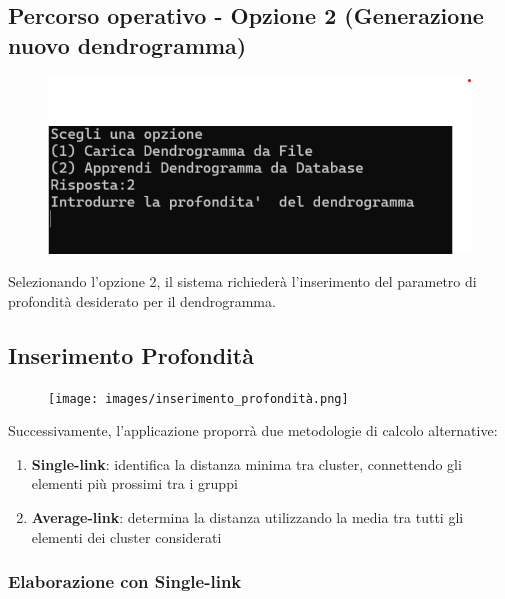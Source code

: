 \subsection{Percorso operativo - Opzione 2 (Generazione nuovo dendrogramma)}

\begin{figure}[h!]
    \centering
    \includegraphics[width=\textwidth]{images/apprendi_datagramma.png}
\end{figure}

Selezionando l'opzione 2, il sistema richiederà l'inserimento del parametro di profondità desiderato per il dendrogramma.

\subsection{Inserimento Profondità}

\begin{figure}[h!]
    \centering
    \texttt{[image: images/inserimento\_profondità.png]}
\end{figure}

Successivamente, l'applicazione proporrà due metodologie di calcolo alternative:
\begin{enumerate}
    \item \textbf{Single-link}: identifica la distanza minima tra cluster, connettendo gli elementi più prossimi tra i gruppi
    \item \textbf{Average-link}: determina la distanza utilizzando la media tra tutti gli elementi dei cluster considerati
\end{enumerate}

\subsubsection{Elaborazione con Single-link}

